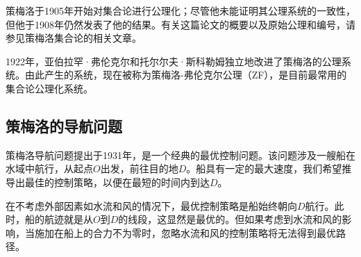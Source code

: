 策梅洛于1905年开始对集合论进行公理化；尽管他未能证明其公理系统的一致性，但他于1908年仍然发表了他的结果。有关这篇论文的概要以及原始公理和编号，请参见策梅洛集合论的相关文章。

1922年，亚伯拉罕·弗伦克尔和托尔尔夫·斯科勒姆独立地改进了策梅洛的公理系统。由此产生的系统，现在被称为策梅洛-弗伦克尔公理（ZF），是目前最常用的集合论公理化系统。
\subsection{策梅洛的导航问题}

策梅洛导航问题提出于1931年，是一个经典的最优控制问题。该问题涉及一艘船在水域中航行，从起点\(O\)出发，前往目的地\(D\)。船具有一定的最大速度，我们希望推导出最佳的控制策略，以便在最短的时间内到达\(D\)。

在不考虑外部因素如水流和风的情况下，最优控制策略是船始终朝向\(D\)航行。此时，船的航迹就是从\(O\)到\(D\)的线段，这显然是最优的。但如果考虑到水流和风的影响，当施加在船上的合力不为零时，忽略水流和风的控制策略将无法得到最优路径。
